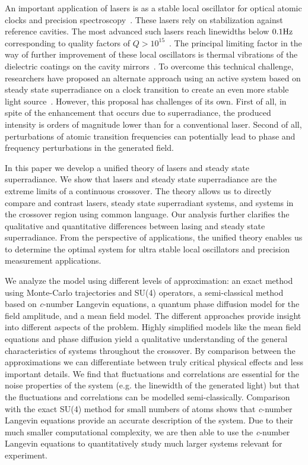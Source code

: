 \documentclass[aps,
twocolumn,
showpacs,
superscriptaddress,groupedaddress]{revtex4}
\begin{document}
An important application of lasers is as a stable local oscillator for
optical atomic clocks and precision
spectroscopy~\cite{RevModPhys.87.637}.  These lasers rely on
stabilization against reference cavities.  The most advanced such
lasers reach linewidths below $0.1 {\rm Hz}$ corresponding to quality
factors of $Q>10^{15}$~\cite{Cole:TenfoldReductionBrownianNoise}. The
principal limiting factor in the way of further improvement of these
local oscillators is thermal vibrations of the dielectric coatings on
the cavity mirrors~\cite{PhysRevLett.101.260602}.  To overcome this
technical challenge, researchers have proposed an alternate approach
using an active system based on steady state superradiance on a clock
transition to create an even more stable light
source~\cite{PhysRevLett.102.163601, ChenDeliciousLaser}.  However,
this proposal has challenges of its own.  First of all, in spite of
the enhancement that occurs due to superradiance, the produced
intensity is orders of magnitude lower than for a conventional laser.
Second of all, perturbations of atomic transition frequencies can
potentially lead to phase and frequency perturbations in the generated
field.

In this paper we develop a unified theory of lasers and steady state
superradiance.  We show that lasers and steady state superradiance are
the extreme limits of a continuous crossover.  The theory allows us to
directly compare and contrast lasers, steady state superradiant
systems, and systems in the crossover region using common language.
Our analysis further clarifies the qualitative and quantitative
differences between lasing and steady state superradiance.  From the
perspective of applications, the unified theory enables us to
determine the optimal system for ultra stable local oscillators and
precision measurement applications.

We analyze the model using different levels of approximation: an exact
method using Monte-Carlo trajectories and SU(4) operators, a
semi-classical method based on {\it c}-number Langevin equations, a
quantum phase diffusion model for the field amplitude, and a mean field
model.  The different approaches provide insight into different aspects
of the problem.  Highly simplified models like the mean field equations
and phase diffusion yield a qualitative understanding of the general
characteristics of systems throughout the crossover.  By comparison
between the approximations we can differentiate between truly critical
physical effects and less important details.  We find that fluctuations
and correlations are essential for the noise properties of the system
(e.g. the linewidth of the generated light) but that the fluctuations
and correlations can be modelled semi-classically.  Comparison with the
exact SU(4) method for small numbers of atoms shows that {\it c}-number
Langevin equations provide an accurate description of the system.  Due
to their much smaller computational complexity, we are then able to use
the {\it c}-number Langevin equations to quantitatively study much
larger systems relevant for experiment.
\end{document}

